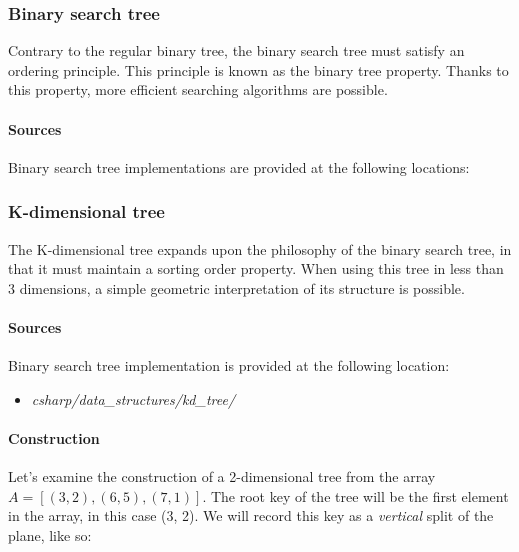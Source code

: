 \documentclass{article}
\begin{document}
\iffalse





\subsubsection{Binary search tree}
Contrary to the regular binary tree, the binary search tree must satisfy an ordering principle.
This principle is known as the binary tree property. Thanks to this property,
more efficient searching algorithms are possible.

\paragraph{Sources}
Binary search tree implementations are provided at the following locations:
\begin{itemize}
\item{{\em csharp/data\_structures/binary\_search\_tree/}}
\item{{\em python\_3/data\_structures/}}
\item{{\em c/data\_structures/}
\item{{\em fsharp/data\_structures/}
\end{itemize}

\subsubsection{K-dimensional tree}
The K-dimensional tree expands upon the philosophy of the binary search tree, in that it
must maintain a sorting order property. When using this tree in less than 3 dimensions,
a simple geometric interpretation of its structure is possible.

\paragraph{Sources}
Binary search tree implementation is provided at the following location:
\begin{itemize}
\item{{\em csharp/data\_structures/kd\_tree/}}
\end{itemize}

\paragraph{Construction}
Let's examine the construction of a 2-dimensional tree from the array \(A = [(3, 2), (6, 5), (7, 1)]\).
The root key of the tree will be the first element in the array, in this case (3, 2).
We will record this key as a {\em vertical} split of the plane, like so:
\end{document}
